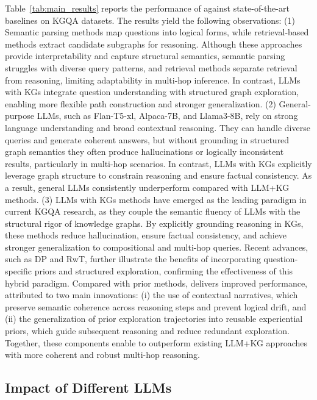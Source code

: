 Table~\ref{tab:main_results} reports the performance of \method{} against state-of-the-art baselines on KGQA datasets. The results yield the following observations: (1) Semantic parsing methods map questions into logical forms, while retrieval-based methods extract candidate subgraphs for reasoning. Although these approaches provide interpretability and capture structural semantics, semantic parsing struggles with diverse query patterns, and retrieval methods separate retrieval from reasoning, limiting adaptability in multi-hop inference. In contrast, LLMs with KGs integrate question understanding with structured graph exploration, enabling more flexible path construction and stronger generalization. (2) General-purpose LLMs, such as Flan-T5-xl, Alpaca-7B, and Llama3-8B, rely on strong language understanding and broad contextual reasoning. They can handle diverse queries and generate coherent answers, but without grounding in structured graph semantics they often produce hallucinations or logically inconsistent results, particularly in multi-hop scenarios. In contrast, LLMs with KGs explicitly leverage graph structure to constrain reasoning and ensure factual consistency. As a result, general LLMs consistently underperform compared with LLM+KG methods. (3) LLMs with KGs methods have emerged as the leading paradigm in current KGQA research, as they couple the semantic fluency of LLMs with the structural rigor of knowledge graphs. By explicitly grounding reasoning in KGs, these methods reduce hallucination, ensure factual consistency, and achieve stronger generalization to compositional and multi-hop queries. Recent advances, such as DP and RwT, further illustrate the benefits of incorporating question-specific priors and structured exploration, confirming the effectiveness of this hybrid paradigm. Compared with prior methods, \method{} delivers improved performance, attributed to two main innovations: (i) the use of contextual narratives, which preserve semantic coherence across reasoning steps and prevent logical drift, and (ii) the generalization of prior exploration trajectories into reusable experiential priors, which guide subsequent reasoning and reduce redundant exploration. Together, these components enable \method{} to outperform existing LLM+KG approaches with more coherent and robust multi-hop reasoning.

\subsection{Impact of Different LLMs}

